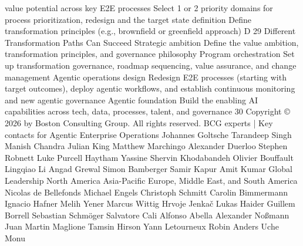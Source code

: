 value potential across key E2E
processes
Select 1 or 2 priority domains for
process prioritization, redesign
and the target state definition
Define transformation
principles (e.g., brownfield or
greenfield approach)
D
29
Different Transformation Paths Can Succeed
Strategic ambition
Define the value ambition, transformation principles, and
governance philosophy
Program orchestration
Set up transformation governance, roadmap sequencing,
value assurance, and change management
Agentic operations design
Redesign E2E processes (starting with target outcomes), deploy agentic
workflows, and establish continuous monitoring and new agentic governance
Agentic foundation
Build the enabling AI capabilities across tech, data,
processes, talent, and governance
30
Copyright © 2026 by Boston Consulting Group. All rights reserved.
BCG experts | Key contacts for Agentic Enterprise Operations
Johannes
Goltsche
Tarandeep
Singh
Manish
Chandra
Julian
King
Matthew
Marchingo
Alexander
Duerloo
Stephen
Robnett
Luke
Purcell
Haytham
Yassine
Shervin
Khodabandeh
Olivier
Bouffault
Lingqiao
Li
Angad
Grewal
Simon
Bamberger
Samir
Kapur
Amit
Kumar
Global Leadership
North America
Asia-Pacific
Europe, Middle East, and South America
Nicolas de
Bellefonds
Michael
Engels
Christoph
Schmitt
Carolin
Bimmermann
Ignacio
Hafner
Melih
Yener
Marcus
Wittig
Hrvoje
Jenkač
Lukas
Haider
Guillem
Borrell
Sebastian
Schmöger
Salvatore
Cali
Alfonso
Abella
Alexander
Noßmann
Juan Martin
Maglione
Tamsin
Hirson
Yann
Letourneux
Robin
Anders
Uche
Monu

